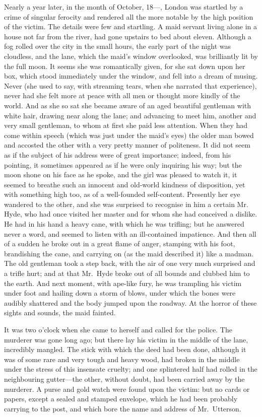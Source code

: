 \documentclass[12pt,openright]{book}
\begin{document}
Nearly a year later, in the month of October, 18—, London was startled by a crime of singular ferocity and rendered all the more notable by the high position of the victim. The details were few and startling. A maid servant living alone in a house not far from the river, had gone upstairs to bed about eleven. Although a fog rolled over the city in the small hours, the early part of the night was cloudless, and the lane, which the maid’s window overlooked, was brilliantly lit by the full moon. It seems she was romantically given, for she sat down upon her box, which stood immediately under the window, and fell into a dream of musing. Never (she used to say, with streaming tears, when she narrated that experience), never had she felt more at peace with all men or thought more kindly of the world. And as she so sat she became aware of an aged beautiful gentleman with white hair, drawing near along the lane; and advancing to meet him, another and very small gentleman, to whom at first she paid less attention. When they had come within speech (which was just under the maid’s eyes) the older man bowed and accosted the other with a very pretty manner of politeness. It did not seem as if the subject of his address were of great importance; indeed, from his pointing, it sometimes appeared as if he were only inquiring his way; but the moon shone on his face as he spoke, and the girl was pleased to watch it, it seemed to breathe such an innocent and old-world kindness of disposition, yet with something high too, as of a well-founded self-content. Presently her eye wandered to the other, and she was surprised to recognise in him a certain Mr. Hyde, who had once visited her master and for whom she had conceived a dislike. He had in his hand a heavy cane, with which he was trifling; but he answered never a word, and seemed to listen with an ill-contained impatience. And then all of a sudden he broke out in a great flame of anger, stamping with his foot, brandishing the cane, and carrying on (as the maid described it) like a madman. The old gentleman took a step back, with the air of one very much surprised and a trifle hurt; and at that Mr. Hyde broke out of all bounds and clubbed him to the earth. And next moment, with ape-like fury, he was trampling his victim under foot and hailing down a storm of blows, under which the bones were audibly shattered and the body jumped upon the roadway. At the horror of these sights and sounds, the maid fainted.

It was two o’clock when she came to herself and called for the police. The murderer was gone long ago; but there lay his victim in the middle of the lane, incredibly mangled. The stick with which the deed had been done, although it was of some rare and very tough and heavy wood, had broken in the middle under the stress of this insensate cruelty; and one splintered half had rolled in the neighbouring gutter—the other, without doubt, had been carried away by the murderer. A purse and gold watch were found upon the victim: but no cards or papers, except a sealed and stamped envelope, which he had been probably carrying to the post, and which bore the name and address of Mr. Utterson.
\end{document}
